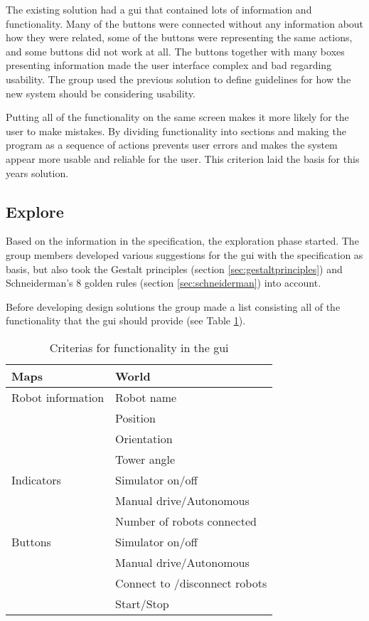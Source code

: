 The existing solution had a \acrshort{gui} that contained lots of information and functionality. Many of the buttons were connected without any information about how they were related, some of the buttons were representing the same actions, and some buttons did not work at all. The buttons together with many boxes presenting information made the user interface complex and bad regarding usability. The group used the previous solution to define guidelines for how the new system should be considering usability.

Putting all of the functionality on the same screen makes it more likely for the user to make mistakes. By dividing functionality into sections and making the program as a sequence of actions prevents user errors and makes the system appear more usable and reliable for the user. This criterion laid the basis for this years solution. 

\subsection{Explore}
\label{sec:explore}
Based on the information in the specification, the exploration phase started. The group members developed various suggestions for the \acrshort{gui} with the specification as basis, but also took the Gestalt principles (section \ref{sec:gestaltprinciples}) and Schneiderman's 8 golden rules (section \ref{sec:schneiderman}) into account.

Before developing design solutions the group made a list consisting all of the functionality that the \acrshort{gui} should provide (see Table \ref{tab:guicriterias}).
\begin{table}[ht]
\begin{center}
 \begin{tabular}{|l l|} 
 \hline
 Maps               &   World \\
 \hline
 Robot information  &   Robot name \\
                    &   Position \\
                    &   Orientation \\
                    &   Tower angle \\
 \hline
 Indicators         &   Simulator on/off \\
                    &   Manual drive/Autonomous \\
                    &   Number of robots connected \\
 \hline
 Buttons            &   Simulator on/off \\
                    &   Manual drive/Autonomous \\
                    &   Connect to /disconnect robots \\
                    &   Start/Stop \\

\hline
\end{tabular}
\end{center}
\caption{Criterias for functionality in the \acrshort{gui}}
\label{tab:guicriterias}
\end{table}

